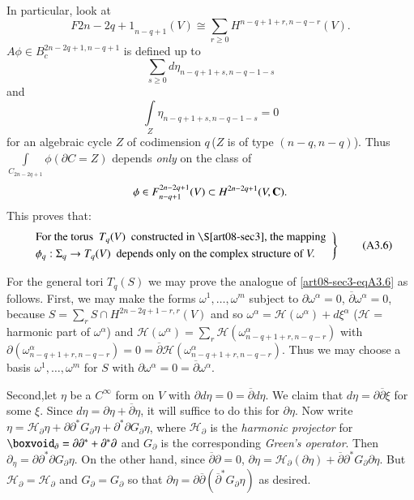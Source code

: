 In particular, look at 
$$
F{2n-2q+1}_{n-q+1}(V)\cong \sum\limits_{r\geq 0}H^{n-q+1+r,n-q-r}(V).
$$ 
$A\phi \in B^{2n-2q+1,n-q+1}_{c}$ is defined up to 
$$
\sum\limits_{s\geq 0}d\eta_{n-q+1+s,n-q-1-s}
$$ 
and 
$$
\int\limits_{Z}\eta_{n-q+1+s,n-q-1-s}=0
$$ 
for an algebraic cycle $Z$ of codimension $q$\,($Z$ is of type $(n-q,n-q)$). Thus $\int\limits_{C_{2n-2q+1}}\phi(\partial C=Z)$ depends {\em only} on the class of 
$$
\phi\in F^{2n-2q+1}_{n-q+1}(V)\subset H^{2n-2q+1}(V,\mathbf{C}).
$$ 
This proves that:
\begin{equation*}
\left.
\begin{array}{l}
\text{For the torus~ } T_{q}(V)\text{~ constructed in \S\ref{art08-sec3}, the mapping}\\[3pt]
\phi_{q}:\Sigma_{q}\to T_{q}(V)\text{~ depends only on the complex structure of } V.
\end{array}\right\}\tag{A3.6}\label{art08-sec3-eqA3.6}
\end{equation*}

For the general tori $T_{q}(S)$ we may prove the analogue of \eqref{art08-sec3-eqA3.6} as follows. First, we may make the forms $\omega^{1},\ldots,\omega^{m}$ subject to $\partial \omega^{\alpha}=0$, $\overline{\partial}\omega^{\alpha}=0$, because $S=\sum\limits_{r}S\cap H^{2n-2q+1-r,r}(V)$ and so $\omega^{\alpha}=\mathscr{H}(\omega^{\alpha})+d\xi^{\alpha}$ ($\mathscr{H}$ = harmonic part of $\omega^{\alpha}$) and $\mathscr{H}(\omega^{\alpha})=\sum\limits_{r}\mathscr{H}(\omega^{\alpha}_{n-q+1+r,n-q-r})$ with $\partial (\omega^{\alpha}_{n-q+1+r,n-q-r})=0=\overline{\partial}\mathscr{H}(\omega^{\alpha}_{n-q+1+r,n-q-r})$. Thus we may choose a basis $\omega^{1},\ldots,\omega^{m}$ for $S$ with $\partial \omega^{\alpha}=0=\overline{\partial}\omega^{\alpha}$.

Second,\pageoriginale let $\eta$ be a $C^{\infty}$ form on $V$ with $\partial d\eta=0=\overline{\partial}d\eta$. We claim that $d\eta=\partial\overline{\partial}\xi$ for some $\xi$. Since $d\eta=\partial\eta+\overline{\partial}\eta$, it will suffice to do this for $\partial\eta$. Now write $\eta=\mathscr{H}_{\partial}\eta+\partial\partial^{*}G_{\partial}\eta+\partial^{*}\partial G_{\partial}\eta$, where $\mathscr{H}_{\partial}$ is the {\em harmonic projector} for $\boxvoid_{\partial}=\partial\partial^{*}+\partial^{*}\partial$ and $G_{\partial}$ is the corresponding {\em Green's operator}. Then $\partial_{\eta}=\partial\partial^{*}\partial G_{\partial}\eta$. On the other hand, since $\overline{\partial}\partial=0$, $\partial\eta=\mathscr{H}_{\partial}(\partial\eta)+\overline{\partial}\partial^{*}G_{\partial}\partial\eta$. But $\mathscr{H}_{\partial}=\mathscr{H}_{\partial}$ and $G_{\partial}=G_{\partial}$ so that $\partial\eta=\partial\overline{\partial}(\overline{\partial}^{*}G_{\partial}\eta)$ as desired.

